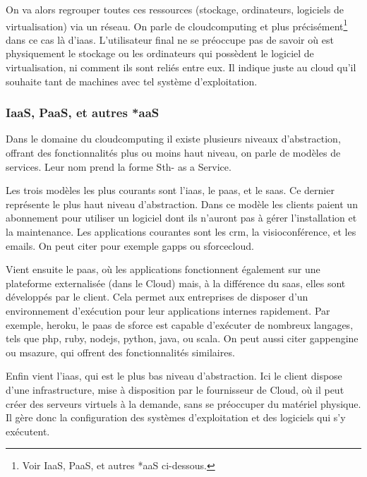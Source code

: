 \documentclass[a4paper,oneside]{report}
\begin{document}
On va alors regrouper toutes ces ressources (stockage, ordinateurs, logiciels de \gls{virtualisation}) via un réseau.
On parle de \gls{cloudcomputing} et plus précisément\footnote{Voir \og IaaS, PaaS, et autres *aaS \fg ci-dessous.} dans ce cas là d'\gls{iaas}.
L'utilisateur final ne se préoccupe pas de savoir où est physiquement le stockage ou les ordinateurs qui possèdent le logiciel de \gls{virtualisation}, ni comment ils sont reliés entre eux. Il indique juste au cloud qu'il souhaite tant de machines avec tel système d'exploitation.

\subsubsection{IaaS, PaaS, et autres *aaS}
  
Dans le domaine du \gls{cloudcomputing} il existe plusieurs niveaux d'abstraction, offrant des fonctionnalités plus ou moins haut niveau, on parle de modèles de services.
Leur nom prend la forme Sth- as a Service.

Les trois modèles les plus courants sont l'\gls{iaas}, le \gls{paas}, et le \gls{saas}.
Ce dernier représente le plus haut niveau d'abstraction.\newline
Dans ce modèle les clients paient un abonnement pour utiliser un logiciel dont ils n'auront pas à gérer l'installation et la maintenance.
Les applications courantes sont les \gls{crm}, la visioconférence, et les emails.
On peut citer pour exemple \gls{gapps} ou \gls{sforcecloud}.

Vient ensuite le \gls{paas}, où les applications fonctionnent également sur une plateforme externalisée (dans le Cloud) mais, à la différence du \gls{saas}, elles sont développés par le client.\newline
Cela permet aux entreprises de disposer d'un environnement d'exécution pour leur applications internes rapidement.
Par exemple, \gls{heroku}, le \gls{paas} de \gls{sforce} est capable d'exécuter de nombreux langages, tels que \gls{php}, \gls{ruby}, \gls{nodejs}, \gls{python}, \gls{java}, ou \gls{scala}.
On peut aussi citer \gls{gappengine} ou \gls{msazure}, qui offrent des fonctionnalités similaires.

Enfin vient l'\gls{iaas}, qui est le plus bas niveau d'abstraction. 
Ici le client dispose d'une infrastructure, mise à disposition par le fournisseur de Cloud, où il peut créer des serveurs virtuels à la demande, sans se préoccuper du matériel physique.
Il gère donc la configuration des systèmes d'exploitation et des logiciels qui s'y exécutent.
\end{document}
